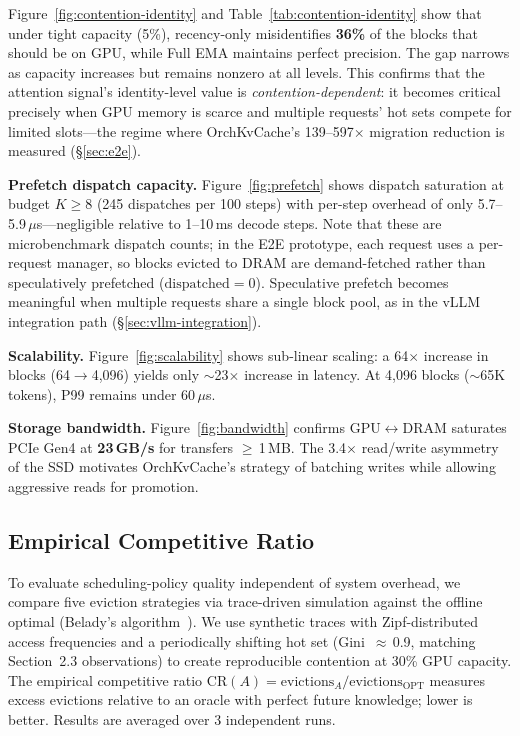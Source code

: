 \documentclass[conference]{IEEEtran}
\begin{document}
Figure~\ref{fig:contention-identity} and Table~\ref{tab:contention-identity} show that under tight capacity (5\%), recency-only misidentifies \textbf{36\%} of the blocks that should be on GPU, while Full EMA maintains perfect precision. The gap narrows as capacity increases but remains nonzero at all levels. This confirms that the attention signal's identity-level value is \emph{contention-dependent}: it becomes critical precisely when GPU memory is scarce and multiple requests' hot sets compete for limited slots---the regime where OrchKvCache's 139--597$\times$ migration reduction is measured (\S\ref{sec:e2e}).

\textbf{Prefetch dispatch capacity.} Figure~\ref{fig:prefetch} shows dispatch saturation at budget $K \geq 8$ (245 dispatches per 100 steps) with per-step overhead of only 5.7--5.9\,$\mu$s---negligible relative to 1--10\,ms decode steps. Note that these are microbenchmark dispatch counts; in the E2E prototype, each request uses a per-request manager, so blocks evicted to DRAM are demand-fetched rather than speculatively prefetched ($\text{dispatched}{=}0$). Speculative prefetch becomes meaningful when multiple requests share a single block pool, as in the vLLM integration path (\S\ref{sec:vllm-integration}).

\textbf{Scalability.} Figure~\ref{fig:scalability} shows sub-linear scaling: a 64$\times$ increase in blocks (64$\to$4,096) yields only ${\sim}$23$\times$ increase in latency. At 4,096 blocks (${\sim}$65K tokens), P99 remains under 60\,$\mu$s.

\textbf{Storage bandwidth.} Figure~\ref{fig:bandwidth} confirms GPU$\leftrightarrow$DRAM saturates PCIe Gen4 at \textbf{23\,GB/s} for transfers $\geq$\,1\,MB. The 3.4$\times$ read/write asymmetry of the SSD motivates OrchKvCache's strategy of batching writes while allowing aggressive reads for promotion.


\subsection{Empirical Competitive Ratio}
\label{sec:competitive-ratio}

To evaluate scheduling-policy quality independent of system overhead, we compare five eviction strategies via trace-driven simulation against the offline optimal (Belady's algorithm~\cite{sleator-tarjan}). We use synthetic traces with Zipf-distributed access frequencies and a periodically shifting hot set (Gini~$\approx$\,0.9, matching Section~2.3 observations) to create reproducible contention at 30\% GPU capacity. The empirical competitive ratio $\text{CR}(A) = \text{evictions}_A / \text{evictions}_{\text{OPT}}$ measures excess evictions relative to an oracle with perfect future knowledge; lower is better. Results are averaged over 3 independent runs.
\end{document}
